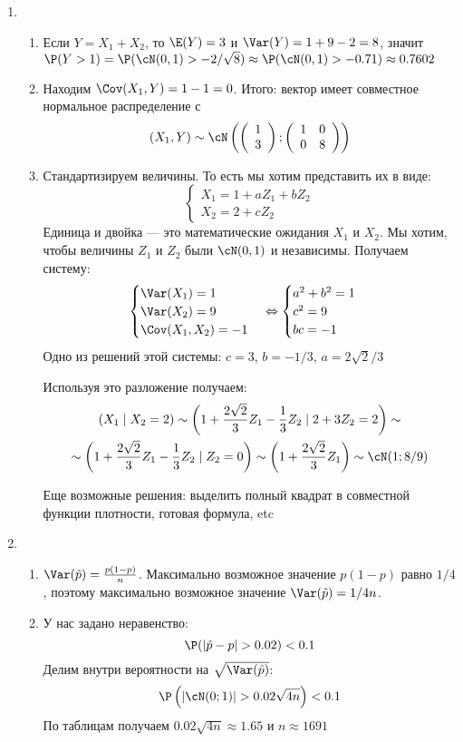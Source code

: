\begin{enumerate}
\item
\begin{enumerate}
\item Если $Y = X_1 + X_2$, то $\E(Y) = 3$ и $\Var(Y) = 1 + 9 - 2 = 8$, значит
$\P(Y > 1) = \P(\cN(0,1) > -2/\sqrt{8}) \approx \P(\cN(0,1) > -0.71) \approx 0.7602$
\item Находим $\Cov(X_1, Y) = 1 - 1 = 0$. Итого: вектор имеет совместное нормальное
распределение с
\[
(X_1,Y) \sim \cN\left(
\left(\begin{array}{l}
{1} \\
{3}
\end{array}\right);
\left(\begin{array}{cc}
{1} & {0} \\
{0} & {8}
\end{array}\right)
\right)
\]
\item Стандартизируем величины. То есть мы хотим представить их в виде:
\[
\begin{cases}
X_1 = 1 + aZ_1 + bZ_2 \\
X_2 = 2 + cZ_2
\end{cases}
\]
Единица и двойка — это математические ожидания $X_1$ и $X_2$. Мы хотим, чтобы
величины $Z_1$ и $Z_2$ были $\cN(0,1)$ и независимы.
Получаем систему:
\[
\begin{cases}
\Var(X_1) = 1 \\
\Var(X_2) = 9 \\
\Cov(X_1,X_2) = -1
\end{cases} \Leftrightarrow
\begin{cases}
a^2 + b^2 = 1 \\
c^2 = 9 \\
bc = -1
\end{cases}
\]
Одно из решений этой системы: $c = 3$, $b = -1/3$, $a = 2\sqrt{2}/3$

Используя это разложение получаем:
\begin{multline*}
\left( X_1 \mid X_2 = 2\right) \sim \left(1 + \frac{2\sqrt{2}}{3}Z_1-\frac{1}{3}Z_2 \mid 2 + 3Z_2 = 2\right)\sim \\
\sim\left(1 + \frac{2\sqrt{2}}{3}Z_1 - \frac{1}{3}Z_2\mid Z_2 = 0\right) \sim \left(1 + \frac{2\sqrt{2}}{3}Z_1\right)\sim \cN(1;8/9)
\end{multline*}

Еще возможные решения: выделить полный квадрат в совместной функции плотности, готовая формула, etc
\end{enumerate}
\item
\begin{enumerate}
\item $\Var(\hat{p}) = \frac{p(1-p)}{n}$. Максимально возможное значение $p(1-p)$
равно $1/4$, поэтому максимально возможное значение $\Var(\hat{p})=1/4n$.
\item У нас задано неравенство:
\[
\P(|\hat{p} - p| > 0.02) < 0.1
\]
Делим внутри вероятности на $\sqrt{\Var(\hat{p})}$:
\[
\P\left(|\cN(0;1)| > 0.02 \sqrt{4n} \right) < 0.1
\]
По таблицам получаем $0.02 \sqrt{4n} \approx 1.65$ и $n \approx 1691$


\end{enumerate}
\end{enumerate}
